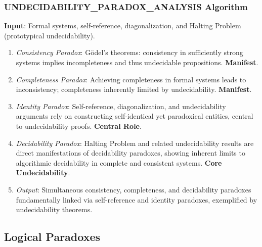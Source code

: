 	\subsubsection{UNDECIDABILITY\_PARADOX\_ANALYSIS Algorithm}
	\textbf{Input}: Formal systems, self-reference, diagonalization, and Halting Problem (prototypical undecidability).
	\begin{enumerate}
		\item \textit{Consistency Paradox}: Gödel's theorems: consistency in sufficiently strong systems implies incompleteness and thus undecidable propositions. \textbf{Manifest}.
		\item \textit{Completeness Paradox}: Achieving completeness in formal systems leads to inconsistency; completeness inherently limited by undecidability. \textbf{Manifest}.
		\item \textit{Identity Paradox}: Self-reference, diagonalization, and undecidability arguments rely on constructing self-identical yet paradoxical entities, central to undecidability proofs. \textbf{Central Role}.
		\item \textit{Decidability Paradox}: Halting Problem and related undecidability results are direct manifestations of decidability paradoxes, showing inherent limits to algorithmic decidability in complete and consistent systems. \textbf{Core Undecidability}.
		\item \textit{Output}: Simultaneous consistency, completeness, and decidability paradoxes fundamentally linked via self-reference and identity paradoxes, exemplified by undecidability theorems.
	\end{enumerate}
	
	
	\subsection{Logical Paradoxes}
	
